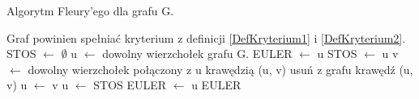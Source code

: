 
\begin{algorithm}
\caption{Algorytm Fleury'ego dla grafu G.}
\label{AlgorytmFleury}
\begin{algorithmic}
\Require Graf powinien spełniać kryterium z definicji \ref{DefKryterium1} i \ref{DefKryterium2}.
\State STOS $\gets$ $\emptyset$
\State u $\gets$ dowolny wierzchołek grafu G.
\State EULER $\gets$  u
\State
\Repeat
		\State STOS $\gets$ u
		\State v $\gets$ dowolny wierzchołek połączony z u krawędzią (u, v)
		\State usuń z grafu krawędź (u, v)
		\State u $\gets$ v
	\Else
		\State u $\gets$ STOS
		\State EULER $\gets$ u
	\EndIf
{}
\State
\State \Return EULER 
\end{algorithmic}
\end{algorithm}

